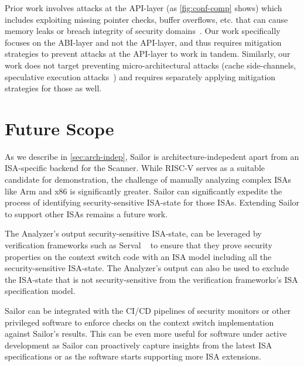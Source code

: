 Prior work involves attacks at the API-layer (as \autoref{fig:conf-comp} shows) which includes exploiting missing pointer checks, buffer overflows, etc. that can cause memory leaks or breach integrity of security domains~\cite{iago, totw}. 
Our work specifically focuses on the ABI-layer and not the API-layer, and thus requires mitigation strategies to prevent attacks at the API-layer to work in tandem. 
Similarly, our work does not target preventing micro-architectural attacks (cache side-channels, speculative execution attacks~\cite{spectre, meltdown, flush-reload}) and requires separately applying mitigation strategies for those as well. 
 


\section{Future Scope}

As we describe in \autoref{sec:arch-indep}, Sailor is architecture-indepedent apart from an ISA-specific backend for the Scanner. 
While RISC-V serves as a suitable candidate for demonstration, the challenge of manually analyzing complex ISAs like Arm and x86 is significantly greater. Sailor can significantly expedite the process of identifying security-sensitive ISA-state for those ISAs. 
Extending Sailor to support other ISAs remains a future work.  

The Analyzer's output \ie{} security-sensitive ISA-state, can be leveraged by verification frameworks such as Serval ~\cite{serval} to ensure that they prove security properties on the context switch code with an ISA model including all the security-sensitive ISA-state. 
The Analyzer's output can also be used to exclude the ISA-state that is not security-sensitive from the verification frameworks's ISA specification model. 

Sailor can be integrated with the CI/CD pipelines of security monitors or other privileged software to enforce checks on the context switch implementation against Sailor's results. 
This can be even more useful for software under active development as Sailor can proactively capture insights from the latest ISA specifications or as the software starts supporting more ISA extensions. 



